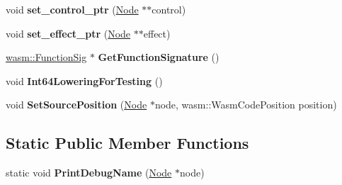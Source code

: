 \begin{DoxyCompactItemize}
\item 
void {\bfseries set\+\_\+control\+\_\+ptr} (\hyperlink{classv8_1_1internal_1_1compiler_1_1_node}{Node} $\ast$$\ast$control)\hypertarget{classv8_1_1internal_1_1compiler_1_1_wasm_graph_builder_a7d356c78d2f232b81dba7c0ebbf1976a}{}\label{classv8_1_1internal_1_1compiler_1_1_wasm_graph_builder_a7d356c78d2f232b81dba7c0ebbf1976a}

\item 
void {\bfseries set\+\_\+effect\+\_\+ptr} (\hyperlink{classv8_1_1internal_1_1compiler_1_1_node}{Node} $\ast$$\ast$effect)\hypertarget{classv8_1_1internal_1_1compiler_1_1_wasm_graph_builder_adb565f62807c31659055ede6d717b3aa}{}\label{classv8_1_1internal_1_1compiler_1_1_wasm_graph_builder_adb565f62807c31659055ede6d717b3aa}

\item 
\hyperlink{classv8_1_1internal_1_1_signature}{wasm\+::\+Function\+Sig} $\ast$ {\bfseries Get\+Function\+Signature} ()\hypertarget{classv8_1_1internal_1_1compiler_1_1_wasm_graph_builder_a4eaa6aecde230948c883db1261208ae8}{}\label{classv8_1_1internal_1_1compiler_1_1_wasm_graph_builder_a4eaa6aecde230948c883db1261208ae8}

\item 
void {\bfseries Int64\+Lowering\+For\+Testing} ()\hypertarget{classv8_1_1internal_1_1compiler_1_1_wasm_graph_builder_aa650569b6f19dcbe6d91eb4822f67d8e}{}\label{classv8_1_1internal_1_1compiler_1_1_wasm_graph_builder_aa650569b6f19dcbe6d91eb4822f67d8e}

\item 
void {\bfseries Set\+Source\+Position} (\hyperlink{classv8_1_1internal_1_1compiler_1_1_node}{Node} $\ast$node, wasm\+::\+Wasm\+Code\+Position position)\hypertarget{classv8_1_1internal_1_1compiler_1_1_wasm_graph_builder_a9c4c61c4955338f692304d6b4d2cf813}{}\label{classv8_1_1internal_1_1compiler_1_1_wasm_graph_builder_a9c4c61c4955338f692304d6b4d2cf813}

\end{DoxyCompactItemize}
\subsection*{Static Public Member Functions}
\begin{DoxyCompactItemize}
\item 
static void {\bfseries Print\+Debug\+Name} (\hyperlink{classv8_1_1internal_1_1compiler_1_1_node}{Node} $\ast$node)\hypertarget{classv8_1_1internal_1_1compiler_1_1_wasm_graph_builder_aa8845a8a925de032002ddca9bd1000df}{}\label{classv8_1_1internal_1_1compiler_1_1_wasm_graph_builder_aa8845a8a925de032002ddca9bd1000df}

\end{DoxyCompactItemize}
